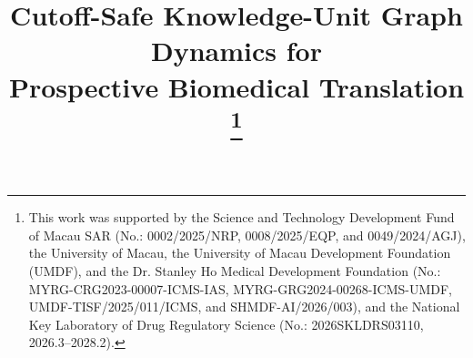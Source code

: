 \documentclass[conference]{IEEEtran}
\begin{document}
\title{Cutoff-Safe Knowledge-Unit Graph Dynamics for\\
Prospective Biomedical Translation
\thanks{This work was supported by the Science and Technology Development Fund of Macau SAR (No.: 0002/2025/NRP, 0008/2025/EQP, and 0049/2024/AGJ), the University of Macau, the University of Macau Development Foundation (UMDF), and the Dr. Stanley Ho Medical Development Foundation (No.: MYRG-CRG2023-00007-ICMS-IAS, MYRG-GRG2024-00268-ICMS-UMDF, UMDF-TISF/2025/011/ICMS, and SHMDF-AI/2026/003), and the National Key Laboratory of Drug Regulatory Science (No.: 2026SKLDRS03110, 2026.3--2028.2).}
}

\author{
\and
{}
\and
{}
}
\end{document}
